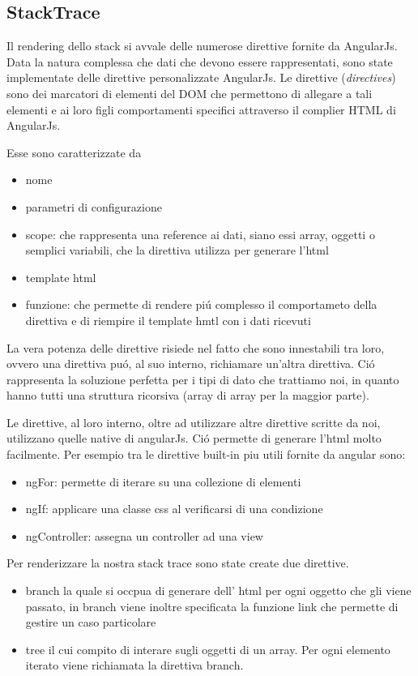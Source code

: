 \subsection{StackTrace} 
Il rendering dello stack si avvale delle numerose direttive fornite da 
AngularJs. \\Data la natura complessa che dati che devono essere rappresentati, sono state 
implementate delle direttive personalizzate AngularJs. 
Le direttive (\emph{directives}) sono dei marcatori di elementi del DOM che permettono di allegare 
a tali elementi e ai loro figli comportamenti specifici attraverso il complier 
HTML di AngularJs. 

Esse sono  caratterizzate da 
\begin{itemize} 
	\item nome 
	\item parametri di configurazione 
	\item scope:  che rappresenta una reference ai dati, siano essi array, oggetti o 
	semplici variabili, che la direttiva utilizza per generare l'html 
	\item template html 
	\item funzione: che permette di rendere piú complesso il comportameto della direttiva 
	e di riempire il template hmtl con i dati ricevuti 
\end{itemize} 

La vera potenza delle direttive risiede nel fatto che sono innestabili tra loro, 
ovvero una direttiva puó, al suo interno, richiamare un'altra direttiva. Ció 
rappresenta la soluzione perfetta per i tipi di dato che trattiamo noi, in quanto 
hanno tutti una struttura ricorsiva (array di array per la maggior parte). 

Le direttive, al loro interno, oltre ad utilizzare altre direttive scritte da noi, 
utilizzano quelle native di angularJs. Ció permette di generare l'html molto 
facilmente. Per esempio tra le direttive built-in piu utili fornite da angular sono: 
\begin{itemize} 
	\item ngFor: permette di iterare su una collezione di elementi 
	\item ngIf: applicare una classe css al verificarsi di una condizione 
	\item ngController: assegna un controller ad una view 
\end{itemize} 

Per renderizzare la nostra stack trace sono state create due direttive. 
\begin{itemize} 
	\item branch la quale si occpua di generare dell' html per ogni oggetto che gli viene passato, 
	in branch viene inoltre specificata la funzione link che permette di gestire un caso particolare 
	\item tree il cui compito di interare sugli oggetti di un array. Per ogni elemento iterato viene richiamata 
	la direttiva branch. 
\end{itemize} 

